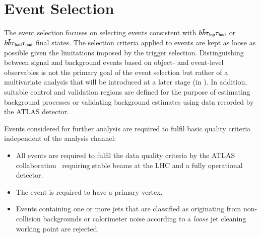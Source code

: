 \section{Event Selection}
\label{sec:event_selection}

The event selection focuses on selecting events consistent with
$b\bar{b}\tau_{\text{lep}}\tau_{\text{had}}$ or $b\bar{b}\tau_{\text{had}}\tau_{\text{had}}$ final states. The selection
criteria applied to events are kept as loose as possible given the limitations imposed by the trigger
selection. Distinguishing between signal and background events based
on object- and event-level observables is not the primary goal of the
event selection but rather of a multivariate analysis that will be
introduced at a later stage (in ). In
addition, suitable control and validation regions are defined for the
purpose of estimating background processes or validating background
estimates using data recorded by the ATLAS detector.

Events considered for further analysis are required to fulfil basic
quality criteria independent of the analysis channel:
\begin{itemize}

\item All events are required to fulfil the data quality criteria by
  the ATLAS collaboration~\cite{DAPR-2018-01} requiring stable beams
  at the LHC and a fully operational detector.

\item The event is required to have a primary vertex.

\item Events containing one or more jets that are classified as originating
  from non-collision backgrounds or calorimeter noise according to a
  \emph{loose} jet cleaning~\cite{ATLAS-CONF-2015-029} working point are
  rejected.
\end{itemize}

